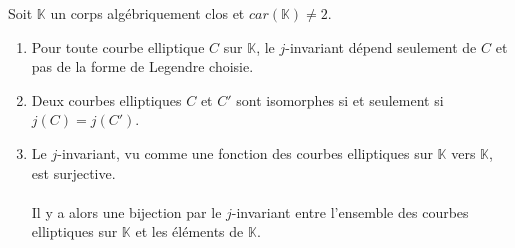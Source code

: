 \documentclass[a4paper]{article}
\begin{document}
\begin{theorem}\label{jinv}
Soit $\mathbb{K}$ un corps algébriquement clos et $car(\mathbb{K}) \neq 2$.
\begin{enumerate}
\item Pour toute courbe elliptique $C$ sur $\mathbb{K}$, le $j$-invariant dépend seulement de $C$ et pas de la forme de Legendre choisie.
\item Deux courbes elliptiques $C$ et $C'$ sont isomorphes si et seulement si \\
$j(C)=j(C')$.
\item  Le $j$-invariant, vu comme une fonction des courbes elliptiques sur $\mathbb{K}$ vers $\mathbb{K}$, est surjective.
\\ \\
Il y a alors une bijection par le $j$-invariant entre l'ensemble des courbes elliptiques sur $\mathbb{K}$ et les éléments de $\mathbb{K}$.
\end{enumerate}
\end{theorem}
\end{document}
